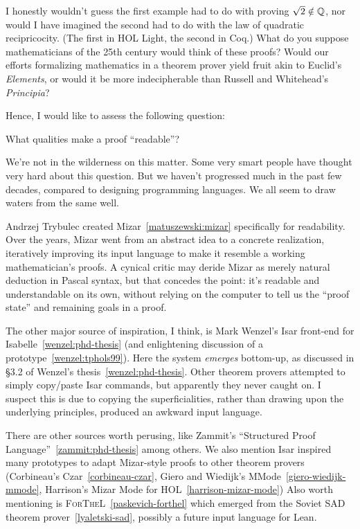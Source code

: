 I honestly wouldn't guess the first example had to do with proving
$\sqrt{2}\notin\mathbb{Q}$, nor would I have imagined the second had to do with
the law of quadratic recipricocity. (The first in HOL Light, the second
in Coq.) What do you suppose mathematicians of the 25th century would
think of these proofs? Would our efforts formalizing mathematics in a
theorem prover yield fruit akin to Euclid's \emph{Elements}, or would it
be more indecipherable than Russell and Whitehead's \emph{Principia}?

Hence, I would like to assess the following question:

\begin{puzzle}
What qualities make a proof ``readable''?
\end{puzzle}

We're not in the wilderness on this matter. Some very smart people have
thought very hard about this question. But we haven't progressed much in
the past few decades, compared to designing programming languages. We
all seem to draw waters from the same well.

Andrzej Trybulec created Mizar~\ref{matuszewski:mizar} specifically for
readability. Over the years, Mizar went from an abstract idea to a
concrete realization, iteratively improving its input language to make
it resemble a working mathematician's proofs. A cynical critic may
deride Mizar as merely natural deduction in Pascal syntax, but that
concedes the point: it's readable and understandable on its own, without
relying on the computer to tell us the ``proof state'' and remaining
goals in a proof.

The other major source of inspiration, I think, is Mark Wenzel's Isar
front-end for Isabelle~\ref{wenzel:phd-thesis} (and enlightening
discussion of a prototype~\ref{wenzel:tphols99}). Here the system
\emph{emerges} bottom-up, as discussed in \S3.2 of Wenzel's
thesis~\ref{wenzel:phd-thesis}. Other theorem provers attempted to
simply copy/paste Isar commands, but apparently they never caught on. I
suspect this is due to copying the superficialities, rather than drawing
upon the underlying principles, produced an awkward input language.

There are other sources worth perusing, like Zammit's ``Structured Proof
Language''~\ref{zammit:phd-thesis} among others. We also mention Isar
inspired many prototypes to adapt Mizar-style proofs to other theorem
provers (Corbineau's Czar~\ref{corbineau-czar}, Giero and Wiedijk's MMode~\ref{giero-wiedijk-mmode},
Harrison's Mizar Mode for HOL~\ref{harrison-mizar-mode})
Also worth mentioning is \textsc{ForTheL}~\ref{paskevich-forthel} which
emerged from the Soviet SAD theorem prover~\ref{lyaletski-sad}, possibly
a future input language for Lean.

